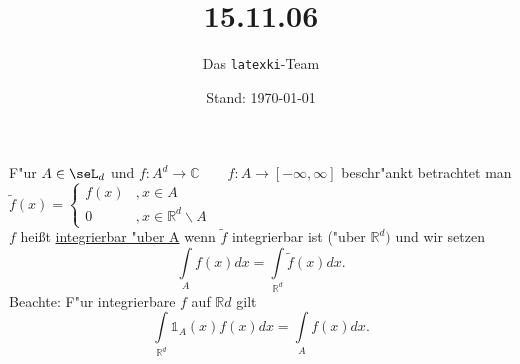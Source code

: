\documentclass[a4paper,11pt]{book}
\title{15.11.06}
\author{Das \texttt{latexki}-Team\\[8 cm]}
\date{Stand: \today}
\newcommand{\R}{{\mathbb R}}
\newcommand{\C}{{\mathbb C}}
\theoremstyle{nonumberplain}
\begin{document}
\maketitle

F"ur $A\in \seL_{d}$ und $f:A^{d}\rightarrow \C \qquad f:A\rightarrow[-\infty,\infty]$ beschr"ankt betrachtet man\\
$\tilde{f}(x)= \begin{cases}
f(x)&,x\in A\\ 
0&, x\in \R^{d}\backslash A \end{cases}$\\
$f$ hei\ss t \underline{integrierbar "uber A} wenn $\tilde{f}$ integrierbar ist ("uber $\R^{d})$ und wir setzen 
\begin{displaymath}
\int\limits_{A}{f}(x)dx = \int\limits_{\R^{d}}\tilde{f}(x)dx.
\end{displaymath}
Beachte: F"ur integrierbare $f$ auf $\R{d}$ gilt
\begin{displaymath}
\int\limits_{\R^{d}}\mathbb{1}_{A}(x){f}(x)dx = \int\limits_{A}{f}(x)dx.
\end{displaymath}
\end{document}

